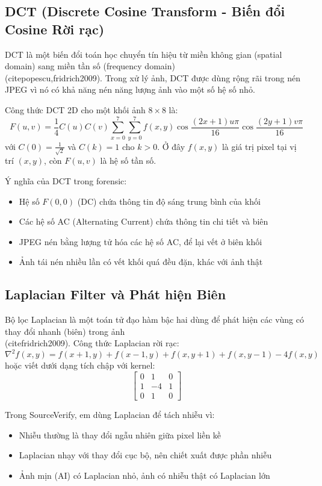 \subsection{DCT (Discrete Cosine Transform - Biến đổi Cosine Rời rạc)}
DCT là một biến đổi toán học chuyển tín hiệu từ miền không gian (spatial domain) sang miền tần số (frequency domain) \\(cite{popescu,fridrich2009}). Trong xử lý ảnh, DCT được dùng rộng rãi trong nén JPEG vì nó có khả năng nén năng lượng ảnh vào một số hệ số nhỏ.

Công thức DCT 2D cho một khối ảnh $8\times8$ là:
\[
F(u,v)=\frac{1}{4}C(u)C(v)\sum_{x=0}^{7}\sum_{y=0}^{7}f(x,y)\cos\frac{(2x+1)u\pi}{16}\cos\frac{(2y+1)v\pi}{16}
\]
với $C(0)=\frac{1}{\sqrt{2}}$ và $C(k)=1$ cho $k>0$. Ở đây $f(x,y)$ là giá trị pixel tại vị trí $(x,y)$, còn $F(u,v)$ là hệ số tần số.

Ý nghĩa của DCT trong forensic:
\begin{itemize}
  \item Hệ số $F(0,0)$ (DC) chứa thông tin độ sáng trung bình của khối
  \item Các hệ số AC (Alternating Current) chứa thông tin chi tiết và biên
  \item JPEG nén bằng lượng tử hóa các hệ số AC, để lại vết ở biên khối
  \item Ảnh tái nén nhiều lần có vết khối quá đều đặn, khác với ảnh thật
\end{itemize}

\subsection{Laplacian Filter và Phát hiện Biên}
Bộ lọc Laplacian là một toán tử đạo hàm bậc hai dùng để phát hiện các vùng có thay đổi nhanh (biên) trong ảnh \\(cite{fridrich2009}). Công thức Laplacian rời rạc:
\[
\nabla^2 f(x,y)=f(x+1,y)+f(x-1,y)+f(x,y+1)+f(x,y-1)-4f(x,y)
\]
hoặc viết dưới dạng tích chập với kernel:
\[
\begin{bmatrix}
0 & 1 & 0 \\
1 & -4 & 1 \\
0 & 1 & 0
\end{bmatrix}
\]

Trong SourceVerify, em dùng Laplacian để tách nhiễu vì:
\begin{itemize}
  \item Nhiễu thường là thay đổi ngẫu nhiên giữa pixel liền kề
  \item Laplacian nhạy với thay đổi cục bộ, nên chiết xuất được phần nhiễu
  \item Ảnh mịn (AI) có Laplacian nhỏ, ảnh có nhiễu thật có Laplacian lớn
\end{itemize}

